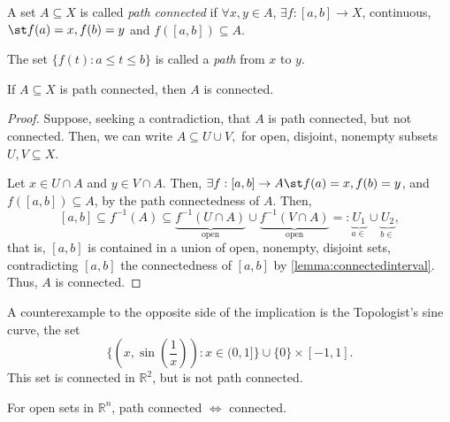 \begin{definition}
    A set $A \subseteq X$ is called \emph{path connected} if $\forall x, y \in A$, $\exists f: [a, b] \to X$, continuous, $\st f(a) = x, f(b) = y$ and $f([a, b]) \subseteq A$. 
    
    The set $\{f(t) : a \leq t \leq b\}$ is called a \emph{path} from $x$ to $y$.
\end{definition}

\begin{theorem}\label{thm:pathconnectedimpconnected}
    If $A \subseteq X$ is path connected, then $A$ is connected.
\end{theorem}

\begin{proof}
    Suppose, seeking a contradiction, that $A$ is path connected, but not connected. Then, we can write $A \subseteq U \cup V,$ for open, disjoint, nonempty subsets $U, V \subseteq X$. 
    
    Let $x \in U \cap A$ and $y \in V \cap A$. Then, $\exists f:[a, b] \to A \st f(a) = x, f(b) =y$, and $f([a, b])\subseteq A$, by the path connectedness of $A$. Then, $$[a, b] \subseteq f^{-1}(A) \subseteq \underbrace{f^{-1}(U \cap A)}_{\text{open}} \cup \underbrace{f^{-1}(V \cap A)}_{\text{open}} =: \underbrace{U_1}_{a \in} \cup \underbrace{U_2}_{b \in},$$ that is, $[a, b]$ is contained in a union of open, nonempty, disjoint sets, contradicting $[a, b]$ the connectedness of $[a, b]$ by \cref{lemma:connectedinterval}. Thus, $A$ is connected.
\end{proof}

\begin{remark}
    A counterexample to the opposite side of the implication is the Topologist's sine curve, the set \[
    \{(x, \sin \left(\frac{1}{x}\right) ): x\in (0, 1] \} \cup \{0\} \times [-1, 1].
    \]
    This set is connected in $\mathbb{R}^2$, but is not path connected.
\end{remark}

\begin{proposition}
    For open sets in $\mathbb{R}^n$, path connected $\iff$ connected.
\end{proposition}